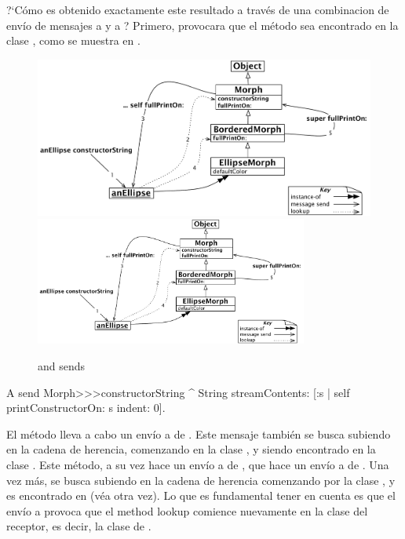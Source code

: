 \documentclass[a4paper,10pt,twoside]{book}
\begin{document}
?`C\'omo es obtenido exactamente este resultado a trav\'es de una combinacion de env\'io de mensajes a \self y a \super ?
Primero,  provocara que el m\'etodo  sea encontrado en la clase ,
como se muestra en .

\begin{figure}[htb]
\begin{center}
\ifluluelse
	{\includegraphics[width=\textwidth]{constructorStringLookup}}
	{\includegraphics[width=0.8\textwidth]{constructorStringLookup}}
\caption{\self and \super sends}
\end{center}
\end{figure}

\begin{method}[constructorString]{A \self send}
Morph>>>constructorString
	^ String streamContents: [:s | self printConstructorOn: s indent: 0].
\end{method}
El m\'etodo  lleva a cabo un env\'io a \self de .
Este mensaje tambi\'en se busca subiendo en la cadena de herencia, comenzando en la clase , y siendo encontrado en la clase .
Este m\'etodo, a su vez hace un env\'io a \self de , que hace un env\'io a \self de .
Una vez m\'as,  se busca subiendo en la cadena de herencia comenzando por la clase , y  es encontrado en  (v\'ea  otra vez).
Lo que es fundamental tener en cuenta es que el env\'io a \self provoca que el method lookup comience nuevamente en la clase del receptor, es decir, la clase de .
\end{document}

